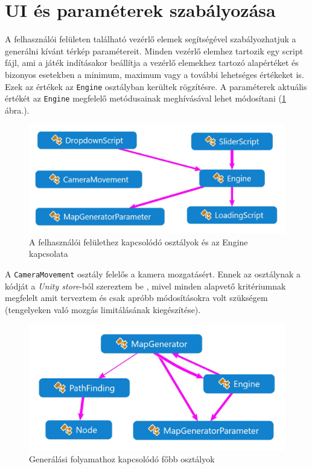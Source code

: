 \section{UI és paraméterek szabályozása}

A felhasználói felületen található vezérlő elemek segítségével szabályozhatjuk a generálni kívánt térkép paramétereit. Minden vezérlő elemhez tartozik egy script fájl, ami a játék indításakor beállítja a vezérlő elemekhez tartozó alapértéket és bizonyos esetekben a minimum, maximum vagy a további lehetséges értékeket is. Ezek az értékek az \texttt{Engine} osztályban kerültek rögzítésre. A paraméterek aktuális értékét az \texttt{Engine} megfelelő metódusainak meghívásával lehet módosítani (\ref{fig:UI} ábra.).

\begin{figure}[h!]
\centering
\includegraphics[scale=0.3]{kepek/White_UI.JPG}
\caption{A felhasználói felülethez kapcsolódó osztályok és az Engine kapcsolata}
\label{fig:UI}
\end{figure}

A \texttt{CameraMovement} osztály felelős a kamera mozgatásért. Ennek az osztálynak a kódját a \textit{Unity store}-ból szereztem be \cite{unitycamera}, mivel minden alapvető kritériumnak megfelelt amit terveztem és csak apróbb módosításokra volt szükségem (tengelyeken való mozgás limitálásának kiegészítése). 

\begin{figure}[h!]
\centering
\includegraphics[scale=0.3]{kepek/White_Generalas.JPG}
\caption{Generálási folyamathoz kapcsolódó főbb osztályok}
\label{fig:generalas}
\end{figure}

